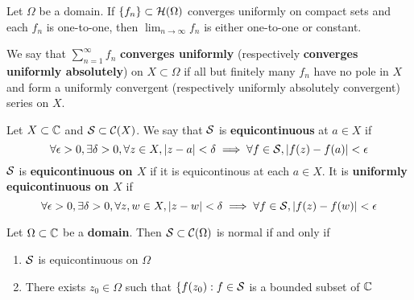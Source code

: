 \documentclass{article}
\begin{document}
\begin{corollary}
  Let \(\Omega\) be a domain. If \(\{f_n\} \subset \mathcal{H}(\Omega)\) converges uniformly on compact sets and each \(f_n\) is one-to-one, then \(\lim_{n \to \infty}f_n\) is either one-to-one or constant.
\end{corollary}

\begin{definition}
  We say that \(\sum_{n = 1}^\infty f_n\) \textbf{converges uniformly} (respectively \textbf{converges uniformly absolutely}) on \(X \subset \Omega\) if all but finitely many \(f_n\) have no pole in \(X\) and form a uniformly convergent (respectively uniformly absolutely convergent) series on \(X\).
\end{definition}

\begin{definition}
  Let \(X \subset \mathbb{C}\) and \(\mathcal{S} \subset \mathcal{C}(X)\). We say that \(\mathcal{S}\) is \textbf{equicontinuous} at \(a \in X\) if
  \begin{equation}
    \forall \epsilon > 0, \exists \delta > 0, \forall z \in X, |z - a| < \delta
      \implies \forall f \in \mathcal{S}, |f(z) - f(a)| < \epsilon
  \end{equation}
  \(\mathcal{S}\) is \textbf{equicontinuous on \(X\)} if it is equicontinous at each \(a \in X\). It is \textbf{uniformly equicontinuous on \(X\)} if
  \begin{equation}
    \forall \epsilon > 0, \exists \delta > 0, \forall z, w \in X, |z - w| <\delta
      \implies \forall f \in \mathcal{S}, |f(z) - f(w)| < \epsilon
  \end{equation}
\end{definition}

\begin{theorem}
Let \(\Omega \subset \mathbb{C}\) be a \textbf{domain}. Then \(\mathcal{S} \subset \mathcal{C}(\Omega)\) is normal if and only if
\begin{enumerate}

  \item \(\mathcal{S}\) is equicontinuous on \(\Omega\)

  \item There exists \(z_0 \in \Omega\) such that \(\{f(z_0) : f \in \mathcal{S}\) is a bounded subset of \(\mathbb{C}\)

\end{enumerate}
\end{theorem}
\end{document}
